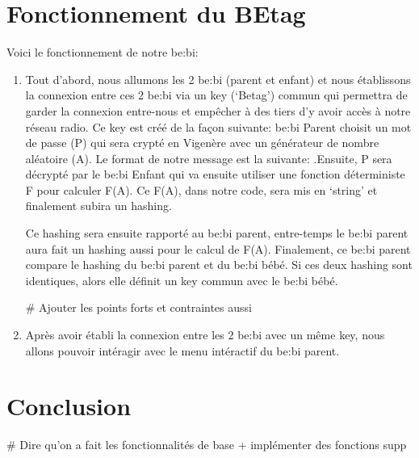 \documentclass [11pt]{article}
\begin{document}
\section{Fonctionnement du BEtag}
\noindent Voici le fonctionnement de notre be\string:bi:
\begin{enumerate}
    \item Tout d’abord, nous allumons les 2 be\string:bi (parent et enfant) et nous établissons la connexion entre ces 2 be\string:bi via un key (‘Betag’) commun qui permettra de garder la connexion entre-nous et empêcher à des tiers d’y avoir accès à notre réseau radio. Ce key est créé de la façon suivante:
be\string:bi Parent choisit un mot de passe (P) qui sera crypté en Vigenère avec un générateur de nombre aléatoire (A). Le format de notre message est la suivante: .Ensuite, P sera décrypté par le be\string:bi Enfant qui va ensuite utiliser une fonction déterministe F pour calculer F(A). Ce F(A), dans notre code, sera mis en ‘string’ et finalement subira un hashing.
    
\noindent Ce hashing sera ensuite rapporté au be\string:bi parent, entre-temps le be:bi parent aura fait un hashing aussi pour le calcul de F(A). Finalement, ce be:bi parent compare le hashing du be\string:bi parent et du be\string:bi bébé. Si ces deux hashing sont identiques, alors elle définit un key commun avec le be\string:bi bébé.

# \noindent Ajouter les points forts et contraintes aussi
    
    \item Après avoir établi la connexion entre les 2 be\string:bi avec un même key, nous allons pouvoir intéragir avec le menu intéractif du be\string:bi parent.

\end{enumerate}

\section{Conclusion}
# Dire qu'on a fait les fonctionnalités de base + implémenter des fonctions supp
\end{document}
